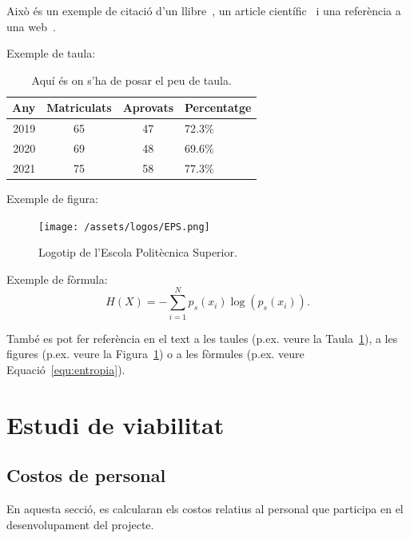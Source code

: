 \documentclass[a4paper,12pt]{ThesisStyle}
\begin{document}
Això és un exemple de citació d'un llibre~\cite{Coleman1974}, un article científic~\cite{Ruiz2008} i una referència a una web~\cite{Halcon}.

Exemple de taula:
\begin{table}[htb]
  \centering
  \begin{tabular}{ | r | c | c | l | }
    \hline
    Any  & Matriculats & Aprovats & Percentatge \\
    \hline
    2019 & 65          & 47       & 72.3\%      \\
    2020 & 69          & 48       & 69.6\%      \\
    2021 & 75          & 58       & 77.3\%      \\
    \hline
  \end{tabular}
  \caption{\label{taula:taulaexemple} Aquí és on s'ha de posar el peu de taula. }
\end{table}

Exemple de figura:
\begin{figure}[htb]
  \centering
  \texttt{[image: /assets/logos/EPS.png]}
  \caption{\label{fig:logo} Logotip de l'Escola Politècnica Superior.}
\end{figure}

Exemple de fòrmula:
\begin{equation}
  H(X) = -\sum_{i=1}^{N}p_s(x_i) \log \left( p_s(x_i) \right).
  \label{equ:entropia}
\end{equation}


També es pot fer referència en el text a les taules (p.ex. veure la Taula~\ref{taula:taulaexemple}), a les figures (p.ex. veure la Figura~\ref{fig:logo}) o a les fòrmules (p.ex. veure Equació~\ref{equ:entropia}).



\chapter{Estudi de viabilitat}
\label{cap:viabilitat}

\section{Costos de personal}
\label{sec:costos_personal}

En aquesta secció, es calcularan els costos relatius al personal que participa en el desenvolupament del projecte.
\end{document}
